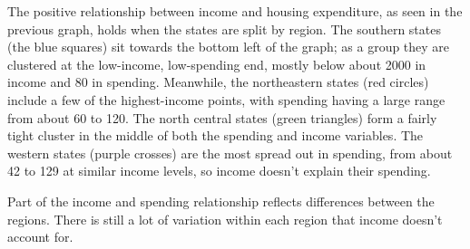 The positive relationship between income and housing expenditure, as seen in the previous graph, holds when the states are split by region. The southern states (the blue squares) sit towards the bottom left of the graph; as a group they are clustered at the low-income, low-spending end, mostly below about 2000 in income and 80 in spending. Meanwhile, the northeastern states (red circles) include a few of the highest-income points, with spending having a large range from about 60 to 120. The north central states (green triangles) form a fairly tight cluster in the middle of both the spending and income variables. The western states (purple crosses) are the most spread out in spending, from about 42 to 129 at similar income levels, so income doesn’t explain their spending.

Part of the income and spending relationship reflects differences between the regions. There is still a lot of variation within each region that income doesn’t account for.
